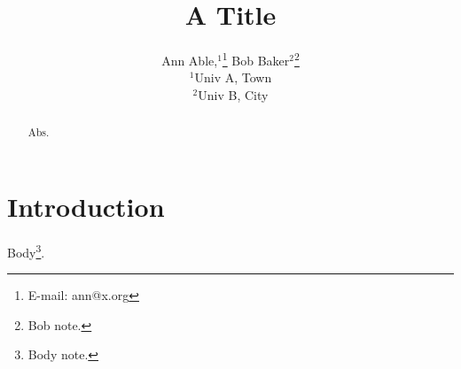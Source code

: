 \documentclass{mnras}
\title{A Title}
\author[A. Able et al.]{Ann Able,$^{1}$\thanks{E-mail: ann@x.org} Bob Baker$^{2}$\thanks{Bob note.}
\\ $^{1}$Univ A, Town\\ $^{2}$Univ B, City}
\begin{document}
\maketitle
\begin{abstract}Abs.\end{abstract}
\section{Introduction}
Body\footnote{Body note.}.
\end{document}
